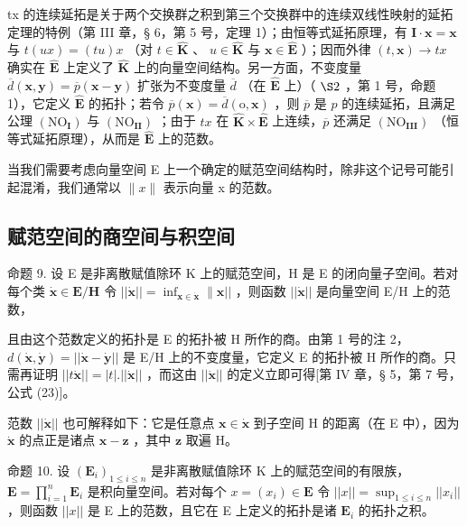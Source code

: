 tx 的连续延拓是关于两个交换群之积到第三个交换群中的连续双线性映射的延拓定理的特例（第 III 章，§ 6，第 5 号，定理 1）；由恒等式延拓原理，有 \(\mathbf{I} \cdot \mathbf{x} = \mathbf{x}\) 与 \(t(ux) = (tu)x\) （对 \(t \in \hat{\mathbf{K}}\) 、 \(u \in \hat{\mathbf{K}}\) 与 \(\mathbf{x} \in \hat{\mathbf{E}}\) ）；因而外律 \((t, \mathbf{x}) \to tx\) 确实在 \(\hat{\mathbf{E}}\) 上定义了 \(\hat{\mathbf{K}}\) 上的向量空间结构。另一方面，不变度量 \(\overline{d}(\mathbf{x}, \mathbf{y}) = \overline{p}(\mathbf{x} - \mathbf{y})\) 扩张为不变度量 \(\overline{d}\) （在 \(\hat{\mathbf{E}}\) 上）（ \(\S 2\) ，第 1 号，命题 1），它定义 \(\hat{\mathbf{E}}\) 的拓扑；若令 \(\overline{p}(\mathbf{x}) = \overline{d}(\mathrm{o}, \mathbf{x})\) ，则 \(\overline{p}\) 是 \(p\) 的连续延拓，且满足公理 \((\mathrm{NO}_{\mathbf{I}})\) 与 \((\mathrm{NO}_{\mathbf{II}})\) ；由于 \(tx\) 在 \(\hat{\mathbf{K}} \times \hat{\mathbf{E}}\) 上连续，\(\overline{p}\) 还满足 \((\mathrm{NO}_{\mathbf{III}})\) （恒等式延拓原理），从而是 \(\hat{\mathbf{E}}\) 上的范数。

当我们需要考虑向量空间 E 上一个确定的赋范空间结构时，除非这个记号可能引起混淆，我们通常以 \(\|x\|\) 表示向量 x 的范数。

\subsection{赋范空间的商空间与积空间}

命题 9. 设 E 是非离散赋值除环 K 上的赋范空间，H 是 E 的闭向量子空间。若对每个类 \(\dot{\mathbf{x}}\in\mathbf{E}/\mathbf{H}\) 令 \(||\dot{\mathbf{x}}||=\inf_{\mathbf{x}\in\dot{\mathbf{x}}}\|\mathbf{x}||\) ，则函数 \(||\dot{\mathbf{x}}||\) 是向量空间 E/H 上的范数，

且由这个范数定义的拓扑是 E 的拓扑被 H 所作的商。由第 1 号的注 2，\(d(\dot{\boldsymbol{x}}, \dot{\boldsymbol{y}}) = ||\dot{\boldsymbol{x}} - \dot{\boldsymbol{y}}||\) 是 E/H 上的不变度量，它定义 E 的拓扑被 H 所作的商。只需再证明 \(||t\dot{\boldsymbol{x}}|| = |t|.||\dot{\boldsymbol{x}}||\) ，而这由 \(||\dot{\boldsymbol{x}}||\) 的定义立即可得{[}第 IV 章，§ 5，第 7 号，公式 (23){]}。

范数 \(||\dot{\pmb{x}}||\) 也可解释如下：它是任意点 \(\pmb{x} \in \dot{\pmb{x}}\) 到子空间 H 的距离（在 E 中），因为 \(\dot{\pmb{x}}\) 的点正是诸点 \(\pmb{x} - \pmb{z}\) ，其中 \(\pmb{z}\) 取遍 H。

命题 10. 设 \((\mathbf{E}_i)_{1 \leqslant i \leqslant n}\) 是非离散赋值除环 K 上的赋范空间的有限族，\(\mathbf{E} = \prod_{i=1}^{n} \mathbf{E}_i\) 是积向量空间。若对每个 \(x = (x_i) \in \mathbf{E}\) 令 \(||x|| = \sup_{1 \leqslant i \leqslant n} ||x_i||\) ，则函数 \(||x||\) 是 E 上的范数，且它在 E 上定义的拓扑是诸 \(\mathbf{E}_i\) 的拓扑之积。

